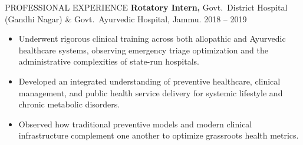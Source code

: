 \begin{rubric}{PROFESSIONAL EXPERIENCE}
\entry*[]%
  \textbf{Rotatory Intern,} Govt.\ District Hospital (Gandhi Nagar) \& Govt.\ Ayurvedic Hospital, Jammu. \hfill 2018 -- 2019
  \begin{itemize}[leftmargin=*, nosep, topsep=2pt]
    \item Underwent rigorous clinical training across both allopathic and Ayurvedic healthcare systems, observing emergency triage optimization and the administrative complexities of state-run hospitals.
    \item Developed an integrated understanding of preventive healthcare, clinical management, and public health service delivery for systemic lifestyle and chronic metabolic disorders.
    \item Observed how traditional preventive models and modern clinical infrastructure complement one another to optimize grassroots health metrics.
  \end{itemize}

\end{rubric}